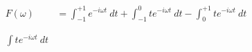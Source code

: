 \documentclass[preview]{standalone}
\begin{document}
\begin{align*}
F(\omega)&=\int_{-1}^{+1}e^{-i\omega t} \ dt+\int_{-1}^{0} t e^{-i\omega t}  \ dt-\int_{0}^{+1} t e^{-i\omega t} \ dt \\ \\ \\  \int t e^{-i\omega t} \ dt
\end{align*}
\end{document}
